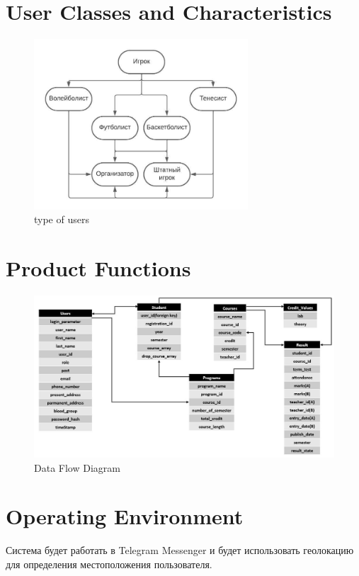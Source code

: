\documentclass{scrreprt}
\begin{document}
\section{User Classes and Characteristics}
\begin{figure}
    \centering
    \includegraphics[width=8cm]{project scope (1).jpeg}
    \caption{type of users}
    \label{fig:type of users}
\end{figure}

\pagebreak

\section{Product Functions}

\begin{figure}[h!]
    \centering
    \includegraphics[width=15cm]{3.JPG}
    \caption{Data Flow Diagram}
    \label{fig:Data Flow Diagram}
\end{figure}


\section{Operating Environment}
Система будет работать в Telegram Messenger и будет использовать геолокацию для определения местоположения пользователя.
\end{document}
